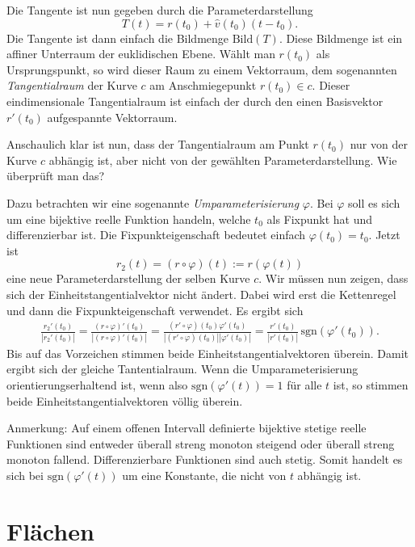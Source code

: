 \documentclass[a4paper,12pt,fleqn]{article}
\begin{document}
Die Tangente ist nun gegeben durch die Parameterdarstellung
\begin{equation}
T(t) = r(t_0)+\hat v(t_0)(t-t_0).
\end{equation}
Die Tangente ist dann einfach die Bildmenge $\mathrm{Bild}(T)$.
Diese Bildmenge ist ein affiner Unterraum der euklidischen
Ebene. Wählt man $r(t_0)$ als Ursprungspunkt, so wird dieser Raum
zu einem Vektorraum, dem sogenannten \textit{Tangentialraum} der
Kurve $c$ am Anschmiegepunkt $r(t_0)\in c$. Dieser
eindimensionale Tangentialraum ist einfach der durch den
einen Basisvektor $r'(t_0)$ aufgespannte Vektorraum.

Anschaulich klar ist nun, dass der Tangentialraum am Punkt $r(t_0)$
nur von der Kurve $c$ abhängig ist, aber nicht von der gewählten
Parameterdarstellung. Wie überprüft man das?

Dazu betrachten wir eine sogenannte \textit{Umparameterisierung}
$\varphi$. Bei $\varphi$ soll es sich um eine bijektive
reelle Funktion handeln, welche $t_0$ als Fixpunkt hat und
differenzierbar ist. Die Fixpunkteigenschaft bedeutet einfach
$\varphi(t_0)=t_0$. Jetzt ist
\begin{equation}
r_2(t) = (r\circ\varphi)(t):=r(\varphi(t))
\end{equation}
eine neue Parameterdarstellung der selben Kurve $c$.
Wir müssen nun zeigen, dass sich der Einheitstangentialvektor
nicht ändert. Dabei wird erst die Kettenregel und dann die
Fixpunkteigenschaft verwendet. Es ergibt sich
\begin{gather*}
\frac{r_2'(t_0)}{|r_2'(t_0)|}
= \frac{(r\circ\varphi)'(t_0)}{|(r\circ\varphi)'(t_0)|}
= \frac{(r'\circ\varphi)(t_0)\varphi'(t_0)}{|(r'\circ\varphi)(t_0)||\varphi'(t_0)|}
= \frac{r'(t_0)}{|r'(t_0)|}\,\mathrm{sgn}(\varphi'(t_0)).
\end{gather*}
Bis auf das Vorzeichen stimmen beide Einheitstangentialvektoren
überein. Damit ergibt sich der gleiche Tantentialraum. Wenn die
Umparameterisierung orientierungserhaltend ist, wenn also
$\mathrm{sgn}(\varphi'(t))=1$ für alle $t$ ist, so stimmen
beide Einheitstangentialvektoren völlig überein.

Anmerkung: Auf einem offenen Intervall definierte bijektive
stetige reelle
Funktionen sind entweder überall streng monoton steigend oder überall
streng monoton fallend. Differenzierbare Funktionen sind auch stetig.
Somit handelt es sich bei $\mathrm{sgn}(\varphi'(t))$ um eine
Konstante, die nicht von $t$ abhängig ist.

\section{Flächen}
\end{document}
